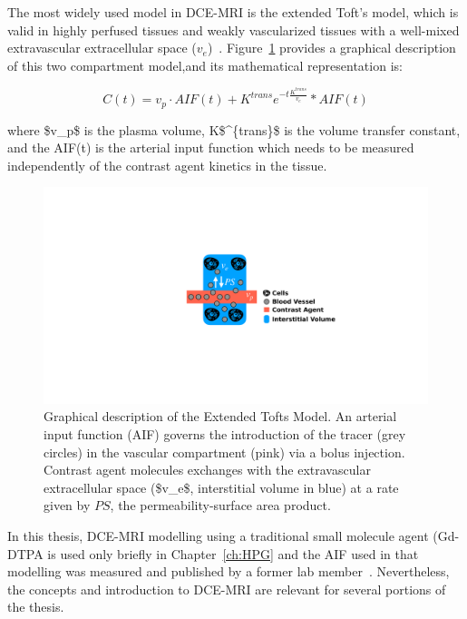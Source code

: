 The most widely used model in \acs{DCE-MRI} is the extended Toft's model, which is valid in highly perfused tissues and weakly vascularized tissues with a well-mixed extravascular extracellular space ($v_e$)~\cite{Sourbron:2013jz}.
Figure~\ref{XTofts} provides a graphical description of this two compartment model,and its mathematical representation is:

\begin{equation}
C(t) = v_p \cdot AIF(t) + K^{trans}e^{-t\frac{K^{trans}}{v_e}} * AIF(t)
\end{equation}

where \acs{$v_p$} is the plasma volume, \acs{K$^{trans}$} is the volume transfer constant, and the \acs{AIF}(t) is the arterial input function which needs to be measured independently of the contrast agent kinetics in the tissue.

\begin{figure}[htbp]
   \centering
   \includegraphics[width=\textwidth]{intro/intro-images/XTofts.pdf}
   \caption[Extended Tofts Model]{Graphical description of the Extended Tofts Model. An arterial input function (\acs{AIF}) governs the introduction of the tracer (grey circles) in the vascular compartment (pink) via a bolus injection. Contrast agent molecules exchanges with the extravascular extracellular space (\acs{$v_e$}, interstitial volume in blue) at a rate given by $PS$, the permeability-surface area product.}
   \label{XTofts}
\end{figure}

In this thesis, \acs{DCE-MRI} modelling using a traditional small molecule agent (\acs{Gd-DTPA} is used only briefly in Chapter~\ref{ch:HPG} and the \acs{AIF} used in that modelling was measured and published by a former lab member~\cite{Moroz:2013ee}.
Nevertheless, the concepts and introduction to \acs{DCE-MRI} are relevant for several portions of the thesis. 

